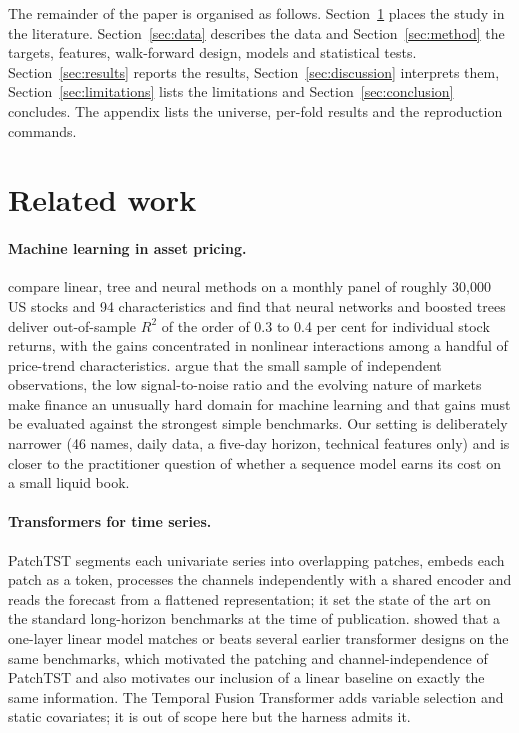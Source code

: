 \documentclass[10pt,a4paper,twoside,twocolumn]{article}
\begin{document}
The remainder of the paper is organised as follows. Section~\ref{sec:related} places the study in the literature. Section~\ref{sec:data} describes the data and Section~\ref{sec:method} the targets, features, walk-forward design, models and statistical tests. Section~\ref{sec:results} reports the results, Section~\ref{sec:discussion} interprets them, Section~\ref{sec:limitations} lists the limitations and Section~\ref{sec:conclusion} concludes. The appendix lists the universe, per-fold results and the reproduction commands.

\section{Related work}\label{sec:related}

\paragraph{Machine learning in asset pricing.} \citet{gu2020empirical} compare linear, tree and neural methods on a monthly panel of roughly 30{,}000 US stocks and 94 characteristics and find that neural networks and boosted trees deliver out-of-sample $R^2$ of the order of 0.3 to 0.4 per cent for individual stock returns, with the gains concentrated in nonlinear interactions among a handful of price-trend characteristics. \citet{israel2020can} argue that the small sample of independent observations, the low signal-to-noise ratio and the evolving nature of markets make finance an unusually hard domain for machine learning and that gains must be evaluated against the strongest simple benchmarks. Our setting is deliberately narrower (46 names, daily data, a five-day horizon, technical features only) and is closer to the practitioner question of whether a sequence model earns its cost on a small liquid book.

\paragraph{Transformers for time series.} PatchTST \citep{nie2023patchtst} segments each univariate series into overlapping patches, embeds each patch as a token, processes the channels independently with a shared encoder and reads the forecast from a flattened representation; it set the state of the art on the standard long-horizon benchmarks at the time of publication. \citet{zeng2023transformers} showed that a one-layer linear model matches or beats several earlier transformer designs on the same benchmarks, which motivated the patching and channel-independence of PatchTST and also motivates our inclusion of a linear baseline on exactly the same information. The Temporal Fusion Transformer \citep{lim2021tft} adds variable selection and static covariates; it is out of scope here but the harness admits it.
\end{document}
